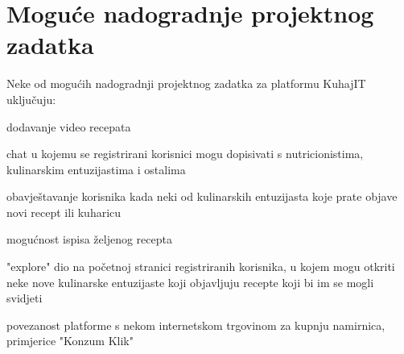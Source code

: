 		\section{Moguće nadogradnje projektnog zadatka}
		Neke od mogućih nadogradnji projektnog zadatka za platformu KuhajIT uključuju:
	\begin{packed_item}
		\item dodavanje video recepata
		\item chat u kojemu se registrirani korisnici mogu dopisivati s nutricionistima, kulinarskim entuzijastima i ostalima
		\item obavještavanje korisnika kada neki od kulinarskih entuzijasta koje prate objave novi recept ili kuharicu
		\item mogućnost ispisa željenog recepta
		\item "explore" dio na početnoj stranici registriranih korisnika, u kojem mogu otkriti neke nove kulinarske entuzijaste koji objavljuju recepte koji bi im se mogli svidjeti
		\item povezanost platforme s nekom internetskom trgovinom za kupnju namirnica, primjerice "Konzum Klik"
	\end{packed_item}
